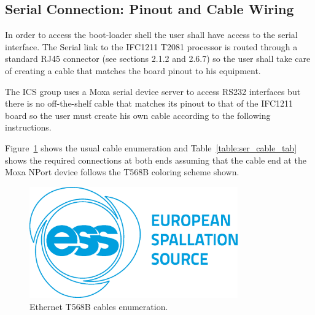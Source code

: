 \documentclass[11pt
  , a4paper
  , article
  , oneside
  , showtrims
]{memoir}
\begin{document}
\subsection{Serial Connection: Pinout and Cable Wiring}
In order to access the boot-loader shell the user shall have access to the serial interface.   
The Serial link to the IFC1211 T2081 processor is routed through a standard RJ45 connector (see \cite{IFC1211_HW_TUG} sections 2.1.2 and 2.6.7) so the user shall take care of creating a cable that matches the board pinout to his equipment.

The ICS group uses a Moxa serial device server\cite{MBUM} to access RS232 interfaces but there is no off-the-shelf cable that matches its pinout to that of the IFC1211 board so the user must create his own cable according to the following instructions.

Figure~\ref{fig:ser_cable} shows the usual cable enumeration and Table~\ref{table:ser_cable_tab} shows the required connections at both ends assuming that the cable end at the Moxa NPort device follows the T568B coloring scheme shown.

\begin{figure}[!htb]
	\centering
	\includegraphics[width=0.80\textwidth]{./figs/ESS_Logo_Frugal_Blue_cmyk.eps}
	\caption{
		Ethernet T568B cables enumeration\cite{CSTIAEIA}.
	}
	\label{fig:ser_cable}   
\end{figure}
\end{document}
